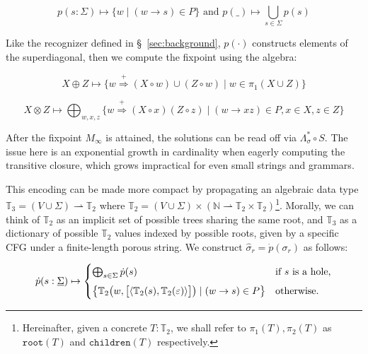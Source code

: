 \documentclass[runningheads]{llncs}
\begin{document}
\begin{equation}
  p(s: \Sigma) \mapsto \{w \mid (w \rightarrow s)\in P\} \text{ and } p(\_) \mapsto \bigcup_{s\in \Sigma} p(s)
\end{equation}

Like the recognizer defined in \S~\ref{sec:background}, $p(\cdot)$ constructs elements of the superdiagonal, then we compute the fixpoint using the algebra:

\begin{equation}
  X \oplus Z \mapsto \big\{w \stackrel{+}{\Rightarrow} (X \circ w) \cup (Z \circ w) \mid w \in \pi_1(X \cup Z)\big\}
\end{equation}

\begin{equation}
  X \otimes Z \mapsto \bigoplus_{w, x, z}\big\{w \stackrel{+}{\Rightarrow} (X\circ x)(Z\circ z) \mid (w\rightarrow xz) \in P, x\in X, z\in Z\big\}
\end{equation}

\noindent After the fixpoint $M_\infty$ is attained, the solutions can be read off via $\Lambda_\sigma^* \circ S$. The issue here is an exponential growth in cardinality when eagerly computing the transitive closure, which grows impractical for even small strings and grammars.

This encoding can be made more compact by propagating an algebraic data type $\mathbb{T}_3 = (V \cup \Sigma) \rightharpoonup \mathbb{T}_2$ where $\mathbb{T}_2 = (V \cup \Sigma) \times (\mathbb{N} \rightharpoonup \mathbb{T}_2\times\mathbb{T}_2)$\footnote{Hereinafter, given a concrete $T:\mathbb{T}_2$, we shall refer to $\pi_1(T), \pi_2(T)$ as $\texttt{root}(T)$ and $\texttt{children}(T)$ respectively.}. Morally, we can think of $\mathbb{T}_2$ as an implicit set of possible trees sharing the same root, and $\mathbb{T}_3$ as a dictionary of possible $\mathbb{T}_2$ values indexed by possible roots, given by a specific CFG under a finite-length porous string. We construct $\hat\sigma_r = \dot{p}(\sigma_r)$ as follows:

\begin{equation}
  \dot{p}(s: \underline\Sigma) \mapsto \begin{cases}
     \bigoplus_{s\in \Sigma} \dot{p}(s) & \text{if $s$ is a hole,} \vspace{5pt}\\
     \big\{\mathbb{T}_2\big(w, \big[\langle\mathbb{T}_2(s), \mathbb{T}_2(\varepsilon)\rangle\big]\big) \mid (w \rightarrow s)\in P\big\} & \text{otherwise.}
  \end{cases}
\end{equation}
\end{document}
